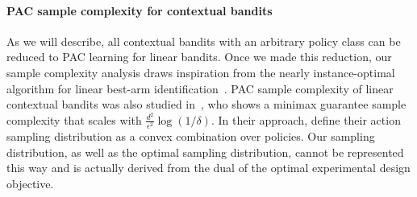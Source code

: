 \documentclass{article}
\newcommand{\1}{\mathbf{1}}
\begin{document}
\paragraph{PAC sample complexity for contextual bandits}
As we will describe, all contextual bandits with an arbitrary policy class can be reduced to PAC learning for linear bandits. 
Once we made this reduction, our sample complexity analysis draws inspiration from the nearly instance-optimal algorithm for linear best-arm identification~\cite{fiez2019sequential}. 
PAC sample complexity of linear contextual bandits was also studied in~\cite{zanette2021design}, who shows a minimax guarantee sample complexity that scales with $\frac{d^2}{\epsilon^2}\log(1/\delta)$.
In their approach, \cite{agarwal2014taming} define their action sampling distribution as a convex combination over policies. %
Our sampling distribution, as well as the optimal sampling distribution, cannot be represented this way and is actually derived from the dual of the optimal experimental design objective.
\end{document}
